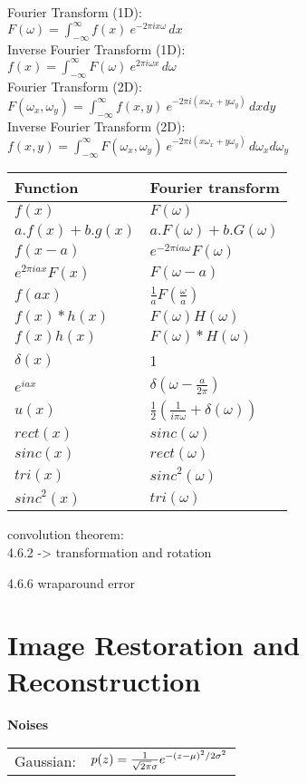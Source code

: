 \documentclass{../cheat}
\begin{document}
\begin{multicols}{3}
	Fourier Transform (1D):\\
	$F(\omega) = \int_{-\infty}^\infty f(x)\ e^{- 2\pi i x \omega}\,dx$\\
	Inverse Fourier Transform (1D):\\
	$f(x) = \int_{-\infty}^\infty F(\omega)\ e^{2 \pi i \omega x}\,d\omega$\\
	
	
	Fourier Transform (2D):\\
	$F(\omega_x,\omega_y) = \int_{-\infty}^\infty f(x,y)\ e^{- 2\pi i (x \omega_x+y \omega_y)}\,dxdy$\\
	Inverse Fourier Transform (2D):\\
	$f(x,y)= \int_{-\infty}^\infty F(\omega_x,\omega_y)\ e^{- 2\pi i (x \omega_x+y \omega_y)}\,d\omega_x d\omega_y$
	
	
	\begin{tabularx}{\columnwidth}{| X	 | X |}
		\hline
		Function & Fourier transform\\
		\hline
		$f(x)$ & $F(\omega)$\\
		\hline
		$a.f(x)+b.g(x)$ & $a.F(\omega)+b.G(\omega)$\\
		\hline
		$f(x - a)$  & $e^{-2\pi i a \omega} F(\omega)$ \\
		\hline
		$e^{2\pi i a x} F(x)$ & $F(\omega-a)$\\
		\hline
		$f(ax)$ & $\frac{1}{a}F(\frac{\omega}{a})$\\
		\hline
		$f(x)*h(x)$ & $F(\omega)H(\omega)$\\
		\hline
		$f(x)h(x)$ & $F(\omega)*H(\omega)$\\
		\hline
		$\delta(x)$ & 1 \\
		\hline
		$e^{i a x}$ & $\delta(\omega-\frac{a}{2\pi})$ \\
		\hline
		$u(x)$ & $\frac{1}{2}(\frac{1}{i\pi \omega}+\delta (\omega))$ \\
		\hline
		$rect(x)$ & $sinc(\omega)$ \\
		\hline
		$sinc(x)$ & $rect(\omega)$ \\
		\hline
		$tri(x)$ & ${sinc}^2(\omega)$ \\
		\hline
		${sinc}^2(x)$ & $tri(\omega)$ \\
		\hline
	\end{tabularx}
	
	
	convolution theorem: \\
	
	4.6.2 -> transformation and rotation
	
	4.6.6 wraparound error
	\section{Image Restoration and Reconstruction}
	\textbf{Noises}\\	
	\begin{tabularx}{\columnwidth}{p{60pt} X}
		Gaussian: & 
		$p(z) = { 1 \over \sqrt{2 \pi } \sigma } e^{-(z-\mu)^2/2 \sigma^2 }$\\
	

\end{tabularx}
\end{multicols}
\end{document}
